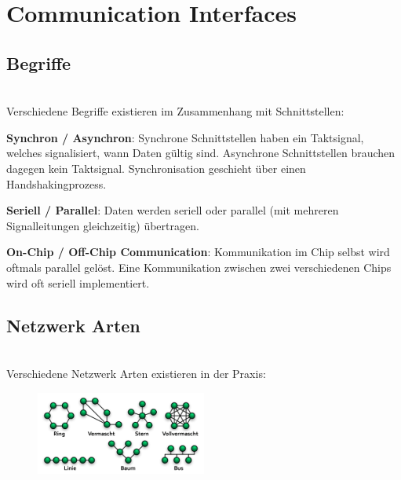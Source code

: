 \section{Communication Interfaces}
\subsection{Begriffe}$~$ \\
Verschiedene Begriffe existieren im Zusammenhang mit Schnittstellen:
\begin{compactitem}
    \item \textbf{Synchron / Asynchron}: Synchrone Schnittstellen haben ein Taktsignal, welches signalisiert, wann Daten gültig sind. Asynchrone Schnittstellen brauchen dagegen kein Taktsignal. Synchronisation geschieht über einen Handshakingprozess.
    \item \textbf{Seriell / Parallel}: Daten werden seriell oder parallel (mit mehreren Signalleitungen gleichzeitig) übertragen.
    \item \textbf{On-Chip / Off-Chip Communication}: Kommunikation im Chip selbst wird oftmals parallel gelöst. Eine Kommunikation zwischen zwei verschiedenen Chips wird oft seriell implementiert.
\end{compactitem}

\subsection{Netzwerk Arten}$~$ \\
Verschiedene Netzwerk Arten existieren in der Praxis:
\begin{figure}[H]
    \includegraphics[width=0.5\textwidth]{images/netzwerkarten.png}
\end{figure}

